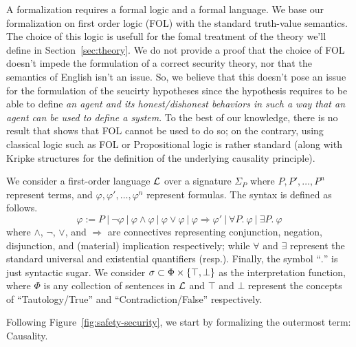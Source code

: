 A formalization requires a formal logic and a formal language.  We base our
formalization on first order logic (FOL) with the standard truth-value
semantics. The choice of this logic is usefull for the fomal treatment of the
theory we'll define in Section~\ref{sec:theory}.  We do not provide a proof
that the choice of FOL doesn't impede the formulation of a correct security
theory, nor that the semantics of English isn't an issue. So, we believe that
this doesn't pose an issue for the formulation of the seucirty hypotheses since
the hypothesis requires to be able to define \emph{an agent and its
honest/dishonest behaviors in such a way that an agent can be used to define a
system}. To the best of our knowledge, there is no result that shows that FOL
cannot be used to do so; on the contrary, using classical logic such as FOL or
Propositional logic is rather standard (along with Kripke structures for the
definition of the underlying causality principle).

We consider a first-order language $\mathcal{L}$ over a
signature $\Sigma_P$ where $P,P',\ldots,P^n$ represent terms, and
$\varphi,\varphi',\ldots,\varphi^n$ represent formulas.
The syntax is defined as follows.
\begin{displaymath}
	\varphi := P~|~\neg\varphi~|~\varphi\wedge\varphi~|~\varphi\vee\varphi~|~\varphi\Rightarrow\varphi'~|~\forall P.~\varphi~|~\exists P.~\varphi
\end{displaymath}
where $\wedge$, $\neg$, $\vee$, and $\Rightarrow$ are connectives representing
conjunction, negation, disjunction, and (material) implication respectively;
while $\forall$ and $\exists$ represent the standard universal and existential
quantifiers (resp.). Finally, the symbol ``$.$'' is just syntactic sugar.  We
consider $\sigma\subset\Phi\times\{\top,\bot\}$ as the interpretation
function, where $\Phi$ is any collection of sentences in $\mathcal{L}$ and $\top$
and $\bot$ represent the concepts of ``Tautology/True'' and
``Contradiction/False'' respectively.


Following Figure~\ref{fig:safety-security}, we start by formalizing the outermost term: Causality.

